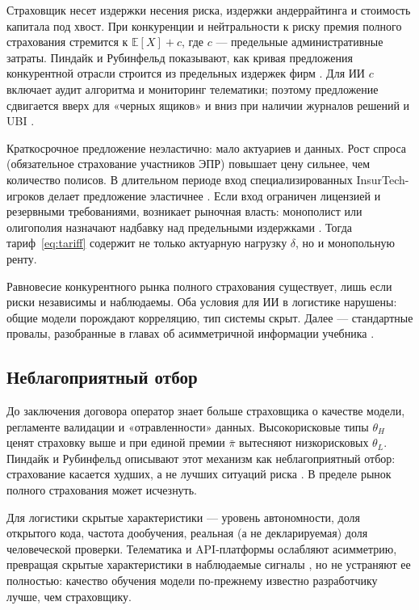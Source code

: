 \documentclass[a4paper,14pt]{extarticle}
\begin{document}
Страховщик несет издержки несения риска, издержки андеррайтинга и стоимость капитала под хвост. При конкуренции и нейтральности к риску премия полного страхования стремится к $\mathbb{E}[X]+c$, где $c$ --- предельные административные затраты. Пиндайк и Рубинфельд показывают, как кривая предложения конкурентной отрасли строится из предельных издержек фирм \cite{pindyck}. Для ИИ $c$ включает аудит алгоритма и мониторинг телематики; поэтому предложение сдвигается вверх для «черных ящиков» и вниз при наличии журналов решений и UBI \cite{maglinova, zezina}.

Краткосрочное предложение неэластично: мало актуариев и данных. Рост спроса (обязательное страхование участников ЭПР) повышает цену сильнее, чем количество полисов. В длительном периоде вход специализированных InsurTech-игроков делает предложение эластичнее \cite{insurtech}. Если вход ограничен лицензией и резервными требованиями, возникает рыночная власть: монополист или олигополия назначают надбавку над предельными издержками \cite{pindyck}. Тогда тариф~\eqref{eq:tariff} содержит не только актуарную нагрузку $\delta$, но и монопольную ренту.

Равновесие конкурентного рынка полного страхования существует, лишь если риски независимы и наблюдаемы. Оба условия для ИИ в логистике нарушены: общие модели порождают корреляцию, тип системы скрыт. Далее --- стандартные провалы, разобранные в главах об асимметричной информации учебника \cite{pindyck}.

\subsection{Неблагоприятный отбор}

До заключения договора оператор знает больше страховщика о качестве модели, регламенте валидации и «отравленности» данных. Высокорисковые типы $\theta_H$ ценят страховку выше и при единой премии $\bar\pi$ вытесняют низкорисковых $\theta_L$. Пиндайк и Рубинфельд описывают этот механизм как неблагоприятный отбор: страхование касается худших, а не лучших ситуаций риска \cite{pindyck}. В пределе рынок полного страхования может исчезнуть.

Для логистики скрытые характеристики --- уровень автономности, доля открытого кода, частота дообучения, реальная (а не декларируемая) доля человеческой проверки. Телематика и API-платформы ослабляют асимметрию, превращая скрытые характеристики в наблюдаемые сигналы \cite{insurtech, maglinova}, но не устраняют ее полностью: качество обучения модели по-прежнему известно разработчику лучше, чем страховщику.
\end{document}
